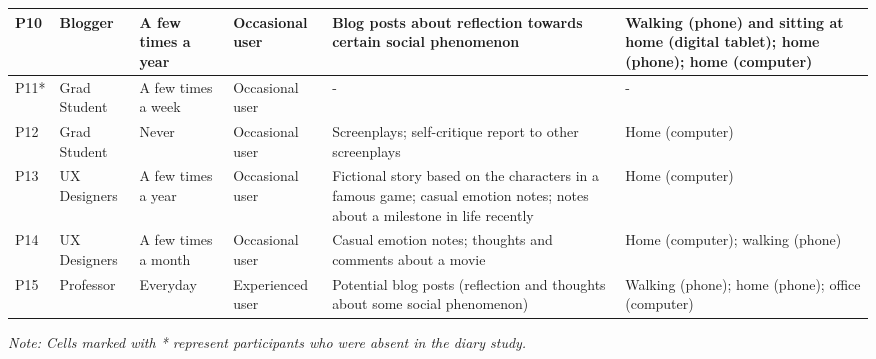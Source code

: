 \begin{table*}[ht!]
\begin{tabular}{|p{1.8cm}|p{2.3cm}|p{1.8cm}|p{2cm}|p{4cm}|p{3.5cm}|}
        P10 & Blogger & A few times a year & Occasional user & Blog posts about reflection towards certain social phenomenon & Walking (phone) and sitting at home (digital tablet); home (phone); home (computer) \\ \hline
        P11* & Grad Student & A few times a week & Occasional user & - & - \\ \hline
        P12 & Grad Student & Never & Occasional user & Screenplays; self-critique report to other screenplays & Home (computer) \\ \hline
        P13 & UX Designers & A few times a year & Occasional user & Fictional story based on the characters in a famous game; casual emotion notes; notes about a milestone in life recently & Home (computer) \\ \hline
        P14 & UX Designers & A few times a month & Occasional user & Casual emotion notes; thoughts and comments about a movie & Home (computer); walking (phone) \\ \hline
        P15 & Professor & Everyday & Experienced user & Potential blog posts (reflection and thoughts about some social phenomenon) & Walking (phone); home (phone); office (computer) \\ \hline
    \end{tabular}
    \par\vspace{0.5em} %
    \parbox{\textwidth}{\textit{Note: Cells marked with * represent participants who were absent in the diary study.}}
\end{table*}
